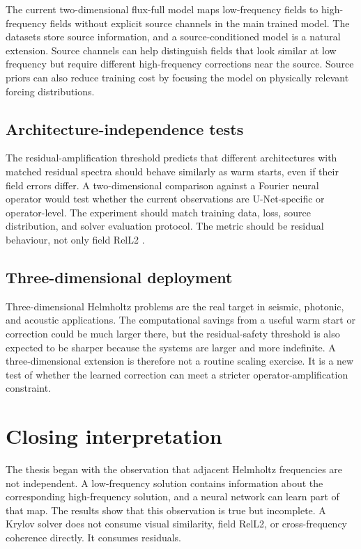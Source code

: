 The current two-dimensional flux-full model maps low-frequency fields to
high-frequency fields without explicit source channels in the main trained
model. The datasets store source information, and a source-conditioned model
is a natural extension. Source channels can help distinguish fields that look
similar at low frequency but require different high-frequency corrections near
the source. Source priors can also reduce training cost by focusing the model
on physically relevant forcing distributions.

\subsection{Architecture-independence tests}
\label{subsec:discussion-future-architecture}

The residual-amplification threshold predicts that different architectures
with matched residual spectra should behave similarly as warm starts, even if
their field errors differ. A two-dimensional comparison against a Fourier
neural operator would test whether the current observations are U-Net-specific
or operator-level. The experiment should match training data, loss, source
distribution, and solver evaluation protocol. The metric should be residual
behaviour, not only field RelL2 \cite{LiEtAl2021FNO}.

\subsection{Three-dimensional deployment}
\label{subsec:discussion-future-3d}

Three-dimensional Helmholtz problems are the real target in seismic,
photonic, and acoustic applications. The computational savings from a useful
warm start or correction could be much larger there, but the residual-safety
threshold is also expected to be sharper because the systems are larger and
more indefinite. A three-dimensional extension is therefore not a routine
scaling exercise. It is a new test of whether the learned correction can meet
a stricter operator-amplification constraint.

\section{Closing interpretation}
\label{sec:discussion-closing}

The thesis began with the observation that adjacent Helmholtz frequencies are
not independent. A low-frequency solution contains information about the
corresponding high-frequency solution, and a neural network can learn part of
that map. The results show that this observation is true but incomplete. A
Krylov solver does not consume visual similarity, field RelL2, or
cross-frequency coherence directly. It consumes residuals.

